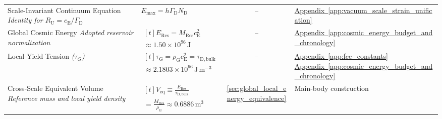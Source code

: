 \begin{longtable}{@{} p{4.5cm} p{6cm} c p{4cm} @{}}
{\raggedright Scale-Invariant Continuum Equation \newline \textit{Identity for $R_{\mathrm U}=c_{\mathrm E}/\Gamma_{\mathrm D}$}\par} & {\raggedright $E_{\mathrm{max}} = h \Gamma_{\mathrm{D}} N_{\mathrm{D}}$\par} & -- & {\raggedright \hyperref[app:vacuum_scale_strain_unification]{Appendix~\ref*{app:vacuum_scale_strain_unification}}\par} \\

{\raggedright Global Cosmic Energy \newline \textit{Adopted reservoir normalization}\par} & {\raggedright $\begin{gathered}[t]E_{\mathrm{Res}}=M_{\mathrm{Res}}c_{\mathrm E}^2 \\ \approx1.50\times10^{96}\,\mathrm J\end{gathered}$\par} & -- & {\raggedright \hyperref[app:cosmic_energy_budget_and_chronology]{Appendix~\ref*{app:cosmic_energy_budget_and_chronology}}\par} \\

{\raggedright Local Yield Tension \newline \textit{($\tau_G$)}\par} & {\raggedright $\begin{gathered}[t]\tau_{\mathrm G}=\rho_{\mathrm G}c_{\mathrm E}^2=\tau_{\mathrm{D,bulk}} \\ \approx2.1803\times10^{96}\,\mathrm{J\,m^{-3}}\end{gathered}$\par} & -- & {\raggedright \hyperref[app:fcc_constants]{Appendix~\ref*{app:fcc_constants}} \newline \hyperref[app:cosmic_energy_budget_and_chronology]{Appendix~\ref*{app:cosmic_energy_budget_and_chronology}}\par} \\

{\raggedright Cross-Scale Equivalent Volume \newline \textit{Reference mass and local yield density}\par} & {\raggedright $\begin{gathered}[t]V_{\mathrm{eq}}\equiv\frac{E_{\mathrm{Res}}}{\tau_{\mathrm{D,bulk}}} \\ =\frac{M_{\mathrm{Res}}}{\rho_{\mathrm G}}\approx0.6886\,\mathrm{m^3}\end{gathered}$\par} & \hyperref[sec:global_local_energy_equivalence]{\ref*{sec:global_local_energy_equivalence}} & {\raggedright Main-body construction\par} \\


\end{longtable}
